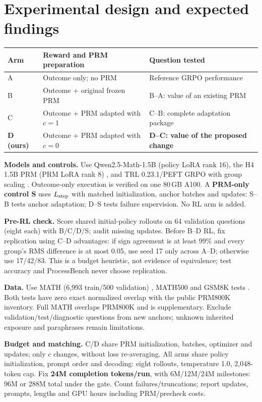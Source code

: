 \documentclass{article}
\begin{document}
\section{Experimental design and expected findings}
\begin{center}
\small
\renewcommand{\arraystretch}{1.12}
\begin{tabularx}{\linewidth}{@{}l L L@{}}
\toprule
\textbf{Arm} & \textbf{Reward and PRM preparation} & \textbf{Question tested} \\
\midrule
A & Outcome only; no PRM & Reference GRPO performance \\
B & Outcome + original frozen PRM & B--A: value of an existing PRM \\
C & Outcome + PRM adapted with $c=1$ & C--B: complete adaptation package \\
\textbf{D (ours)} & Outcome + PRM adapted with $c=0$ & \textbf{D--C: value of the proposed change} \\
\bottomrule
\end{tabularx}
\end{center}
\textbf{Models and controls.} Use Qwen2.5-Math-1.5B (policy LoRA rank 16), the H4 1.5B PRM (PRM LoRA rank 8) \citep{h4prm}, and TRL 0.23.1/PEFT GRPO with group scaling \citep{trl}. Outcome-only execution is verified on one 80\,GB A100. A \textbf{PRM-only control S} uses $L_{\rm step}$ with matched initialization, anchor batches and updates: S--B tests anchor adaptation; D--S tests failure supervision. No RL arm is added.

\textbf{Pre-RL check.} Score shared initial-policy rollouts on 64 validation questions (eight each) with B/C/D/S; audit missing updates. Before B--D RL, fix replication using C--D advantages: if sign agreement is at least 99\% and every group's RMS difference is at most 0.05, use seed 17 only across A--D; otherwise use 17/42/83. This is a budget heuristic, not evidence of equivalence; test accuracy and ProcessBench never choose replication.

\textbf{Data.} Use MATH (6,993 train/500 validation) \citep{hendrycks2021}, MATH500 and GSM8K tests \citep{cobbe2021}. Both tests have zero exact normalized overlap with the public PRM800K inventory. Full MATH overlaps PRM800K \citep{prmdata} and is supplementary. Exclude validation/test/diagnostic questions from new anchors; unknown inherited exposure and paraphrases remain limitations.

\textbf{Budget and matching.} C/D share PRM initialization, batches, optimizer and updates; only $c$ changes, without loss re-averaging. All arms share policy initialization, prompt order and decoding: eight rollouts, temperature 1.0, 2,048-token cap. Fix \textbf{24M completion tokens/run}, with 6M/12M/24M milestones: 96M or 288M total under the gate. Count failures/truncations; report updates, prompts, lengths and GPU hours including PRM/precheck costs.
\end{document}
